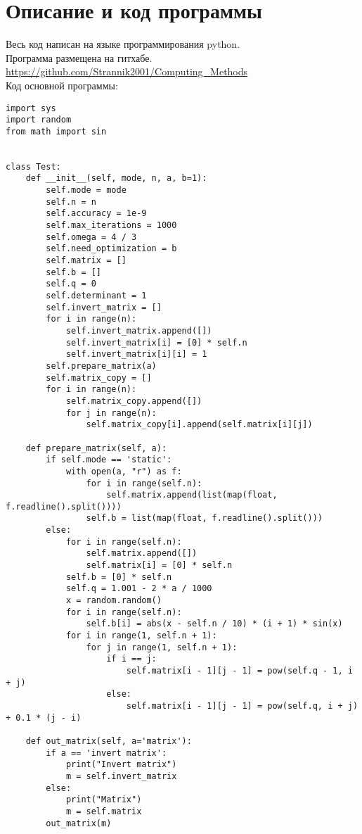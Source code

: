 \documentclass[a4paper,12pt,titlepage,finall]{article}
\begin{document}
\section{Описание и код программы}
Весь код написан на языке программирования python.\\ 
Программа размещена на гитхабе. \href{https://github.com/Strannik2001/Computing_Methods}{https://github.com/Strannik2001/Computing\_Methods}\\

Код основной программы:
\begin{lstlisting}
import sys
import random
from math import sin


class Test:
    def __init__(self, mode, n, a, b=1):
        self.mode = mode
        self.n = n
        self.accuracy = 1e-9
        self.max_iterations = 1000
        self.omega = 4 / 3
        self.need_optimization = b
        self.matrix = []
        self.b = []
        self.q = 0
        self.determinant = 1
        self.invert_matrix = []
        for i in range(n):
            self.invert_matrix.append([])
            self.invert_matrix[i] = [0] * self.n
            self.invert_matrix[i][i] = 1
        self.prepare_matrix(a)
        self.matrix_copy = []
        for i in range(n):
            self.matrix_copy.append([])
            for j in range(n):
                self.matrix_copy[i].append(self.matrix[i][j])

    def prepare_matrix(self, a):
        if self.mode == 'static':
            with open(a, "r") as f:
                for i in range(self.n):
                    self.matrix.append(list(map(float, f.readline().split())))
                self.b = list(map(float, f.readline().split()))
        else:
            for i in range(self.n):
                self.matrix.append([])
                self.matrix[i] = [0] * self.n
            self.b = [0] * self.n
            self.q = 1.001 - 2 * a / 1000
            x = random.random()
            for i in range(self.n):
                self.b[i] = abs(x - self.n / 10) * (i + 1) * sin(x)
            for i in range(1, self.n + 1):
                for j in range(1, self.n + 1):
                    if i == j:
                        self.matrix[i - 1][j - 1] = pow(self.q - 1, i + j)
                    else:
                        self.matrix[i - 1][j - 1] = pow(self.q, i + j) + 0.1 * (j - i)

    def out_matrix(self, a='matrix'):
        if a == 'invert matrix':
            print("Invert matrix")
            m = self.invert_matrix
        else:
            print("Matrix")
            m = self.matrix
        out_matrix(m)


\end{lstlisting}
\end{document}
